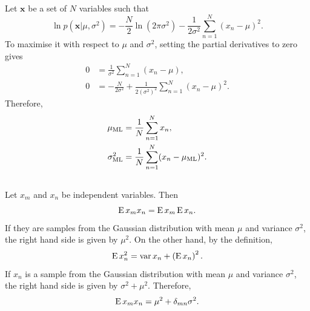 \subsection{}
\label{1.11}
Let $\mathbf{x}$ be a set of $N$ variables such that
%
\begin{equation}
\ln p 
\left( 
	\mathbf{x} 
	| 
	\mu, 
	\sigma ^ 2 
\right) 
= 
- 
\frac{N}{2} 
\ln 
\left( 
	2 \pi \sigma ^ 2 
\right) 
- 
\frac{1}{2 \sigma ^ 2} 
\sum_{n = 1}^{N} 
(x_n - \mu) ^ 2.
\end{equation}
%
To maximise it with respect to $\mu$ and $\sigma ^ 2$, setting the partial derivatives to zero gives
%
\begin{equation}
\begin{aligned}
0 
&= 
\frac{1}{\sigma ^ 2} 
\sum_{n = 1}^{N} 
(x_n - \mu), \\
0 
&= 
- 
\frac{N}{2 \sigma ^ 2} 
+ 
\frac{1}{2 \left( \sigma ^ 2 \right) ^ 2} 
\sum_{n = 1}^{N} 
(x_n - \mu) ^ 2.
\end{aligned}
\end{equation}
%
Therefore,
%
\begin{equation}
\begin{aligned}
\mu_{\rm ML} 
&= 
\frac{1}{N} 
\sum_{n = 1}^{N} 
x_n, \\
\sigma_{\rm ML} ^ 2 
&= 
\frac{1}{N} 
\sum_{n = 1}^{N} 
(x_n - \mu_{\rm ML}) ^ 2.
\end{aligned}
\end{equation}
%


\subsection{}
\label{1.12}
Let $x_m$ and $x_n$ be independent variables. 
Then
%
\begin{equation}
\operatorname{E} x_m x_n 
= 
\operatorname{E} x_m 
\operatorname{E} x_n.
\end{equation}
%
If they are samples from the Gaussian distribution with mean $\mu$ and variance $\sigma ^ 2$, the right hand side is given by $\mu ^ 2$.
On the other hand, by the definition, 
%
\begin{equation}
\operatorname{E} x_n ^ 2 
=  
\operatorname{var} x_n 
+ 
\left( 
	\operatorname{E} x_n 
\right) ^ 2.
\end{equation}
%
If $x_n$ is a sample from the Gaussian distribution with mean $\mu$ and variance $\sigma ^ 2$, the right hand side is given by $\sigma ^ 2 + \mu ^ 2$.
Therefore,
%
\begin{equation}
\operatorname{E} x_m x_n 
= 
\mu ^ 2 
+ 
\delta_{mn}
\sigma ^ 2.
\end{equation}
%

